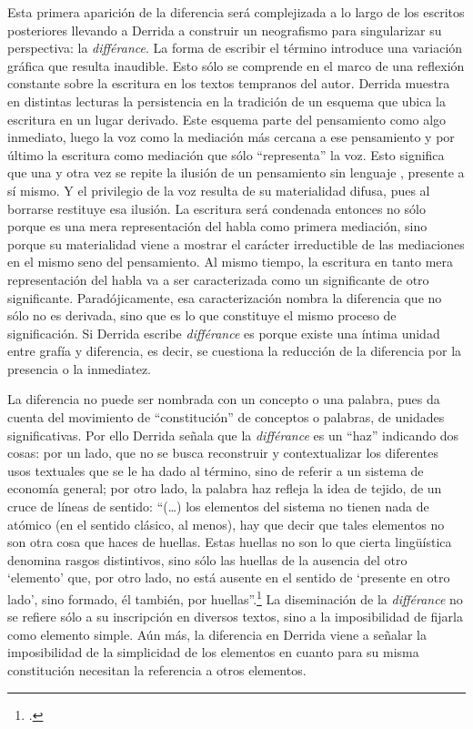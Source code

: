 Esta primera aparición de la diferencia será complejizada a lo largo de los escritos posteriores llevando a Derrida a construir un neografismo para singularizar su perspectiva: la \emph{différance}. La forma de escribir el término introduce una variación gráfica que resulta inaudible. Esto sólo se comprende en el marco de una reflexión constante sobre la escritura en los textos tempranos del autor. Derrida muestra en distintas lecturas la persistencia en la tradición de un esquema que ubica la escritura en un lugar derivado. Este esquema parte del pensamiento como algo inmediato, luego la voz como la mediación más cercana a ese pensamiento y por último la escritura como mediación que sólo \enquote{representa} la voz. Esto significa que una y otra vez se repite la ilusión de un pensamiento sin lenguaje , presente a sí mismo. Y el privilegio de la voz resulta de su materialidad difusa, pues al borrarse restituye esa ilusión. La escritura será condenada entonces no sólo porque es una mera representación del habla como primera mediación, sino porque su materialidad viene a mostrar el carácter irreductible de las mediaciones en el mismo seno del pensamiento. Al mismo tiempo, la escritura en tanto mera representación del habla va a ser caracterizada como un significante de otro significante. Paradójicamente, esa caracterización nombra la diferencia que no sólo no es derivada, sino que es lo que constituye el mismo proceso de significación. Si Derrida escribe \emph{différance} es porque existe una íntima unidad entre grafía y diferencia, es decir, se cuestiona la reducción de la diferencia por la presencia o la inmediatez.

La diferencia no puede ser nombrada con un concepto o una palabra, pues da cuenta del movimiento de \enquote{constitución} de conceptos o palabras, de unidades significativas. Por ello Derrida señala que la \emph{différance} es un \enquote{haz} indicando dos cosas: por un lado, que no se busca reconstruir y contextualizar los diferentes usos textuales que se le ha dado al término, sino de referir a un sistema de economía general; por otro lado, la palabra haz refleja la idea de tejido, de un cruce de líneas de sentido: \enquote{(\dots) los elementos del sistema no tienen nada de atómico (en el sentido clásico, al menos), hay que decir que tales elementos no son otra cosa que haces de huellas. Estas huellas no son lo que cierta lingüística denomina rasgos distintivos, sino sólo las huellas de la ausencia del otro \enquote{elemento} que, por otro lado, no está ausente en el sentido de \enquote{presente en otro lado}, sino formado, él también, por huellas}.\footcite[95]{@6979-BENNINGTON1994} La diseminación de la \emph{différance} no se refiere sólo a su inscripción en diversos textos, sino a la imposibilidad de fijarla como elemento simple. Aún más, la diferencia en Derrida viene a señalar la imposibilidad de la simplicidad de los elementos en cuanto para su misma constitución necesitan la referencia a otros elementos.

